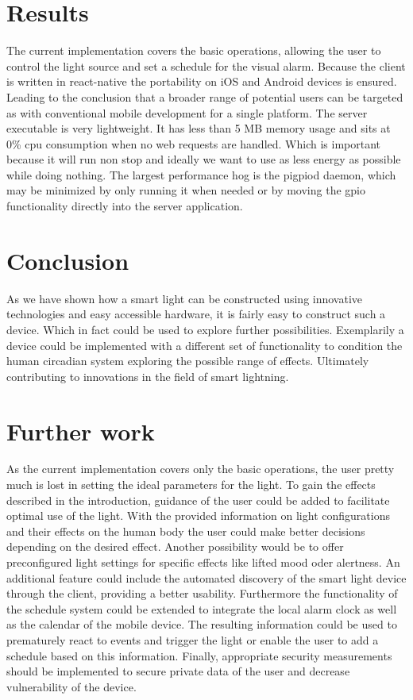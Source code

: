\documentclass[conference]{IEEEtran}
\begin{document}
\section{Results}
The current implementation covers the basic operations, allowing the user to control the light source and set a schedule
for the visual alarm.
Because the client is written in react-native the portability on iOS and Android devices is ensured. Leading to the conclusion
that a broader range of potential users can be targeted as with conventional mobile development for a single platform.
The server executable is very lightweight. It has less than 5 MB memory usage and sits at 0\% cpu consumption when no web
requests are handled. Which is important because it will run non stop and ideally we want to use as less energy as possible while
doing nothing. The largest performance hog is the pigpiod daemon, which may be minimized by only running it when needed or by moving
the gpio functionality directly into the server application.


\section{Conclusion}
As we have shown how a smart light can be constructed using innovative technologies and easy accessible hardware, it is fairly
easy to construct such a device. Which in fact could be used to explore further possibilities. Exemplarily a device could be
implemented with a different set of functionality to condition the human circadian system exploring the possible range of effects.
Ultimately contributing to innovations in the field of smart lightning.


\section{Further work}
As the current implementation covers only the basic operations, the user pretty much is lost in setting the ideal parameters
for the light.
To gain the effects described in the introduction, guidance of the user could be added to facilitate
optimal use of the light. With the provided information on light configurations and their effects on the human body
the user could make better decisions depending on the desired effect. Another possibility would be to offer preconfigured
light settings for specific effects like lifted mood oder alertness.
An additional feature could include the automated discovery of the smart light device through the client, providing a
better usability.
Furthermore the functionality of the schedule system could be extended to integrate the local alarm clock as well as the calendar
of the mobile device. The resulting information could be used to prematurely react to events and trigger the light or enable the user
to add a schedule based on this information.
Finally, appropriate security measurements should be implemented to secure private data of the user and decrease vulnerability of the device.



\end{document}
